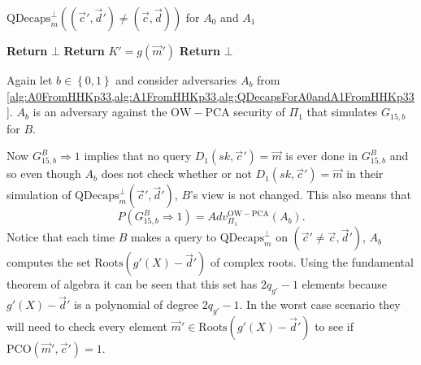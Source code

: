 \begin{center}
\begin{minipage}[ht!]{0.9\textwidth}
	\begin{algorithm}[H]
		\centering
		\caption{$\mathrm{QDecaps}^{\bot}_m\left(\left(\vec{c}', \vec{d}'\right) \neq \left(\vec{c}, \vec{d}\right)\right)$ for $A_0$ and $A_1$}
		\label{alg:QDecapsForA0andA1FromHHKp33}
		\begin{algorithmic}
				\State \textbf{Return} $\bot$
			\EndIf
				\State \textbf{Return} $K' = g\left( \vec{m}' \right)$
			\Else
				\State \textbf{Return} $\bot$
			\EndIf
		\end{algorithmic}
	\end{algorithm}
\end{minipage}
\end{center}

Again let $b \in \left\{ 0,1 \right\}$ and consider adversaries $A_b$ from \cref{alg:A0FromHHKp33,alg:A1FromHHKp33,alg:QDecapsForA0andA1FromHHKp33}. $A_b$ is an adversary against the $\mathrm{OW-PCA}$ security of $\Pi_1$ that simulates $G_{15,b}$ for $B$.

Now $G_{15,b}^B \Rightarrow 1$ implies that no query $D_1\left( sk, \vec{c}' \right) = \vec{m}$ is ever done in $G_{15,b}^B$ and so even though $A_b$ does not check whether or not $D_1\left( sk, \vec{c}' \right) = \vec{m}$ in their simulation of $\mathrm{QDecaps}^{\bot}_m\left(\vec{c}', \vec{d}'\right)$, $B$'s view is not changed. This also means that
\[
	P\left( G_{15,b}^B \Rightarrow 1 \right) = Adv_{\Pi_1}^{\mathrm{OW-PCA}}\left(A_b\right).
\]
Notice that each time $B$ makes a query to $\mathrm{QDecaps}^{\bot}_m$ on $\left(\vec{c}' \neq \vec{c}, \vec{d}'\right)$, $A_b$ computes the set $\mathrm{Roots}\left( g'\left(X\right) - \vec{d}' \right)$ of complex roots. Using the fundamental theorem of algebra it can be seen that this set has $2 q_{g'} - 1$ elements because $g'\left(X\right) - \vec{d}'$ is a polynomial of degree $2 q_{g'} - 1$. In the worst case scenario they will need to check every element $\vec{m}' \in \mathrm{Roots}\left( g'\left(X\right) - \vec{d}' \right)$ to see if $\mathrm{PCO}\left( \vec{m}', \vec{c}' \right) = 1$.

